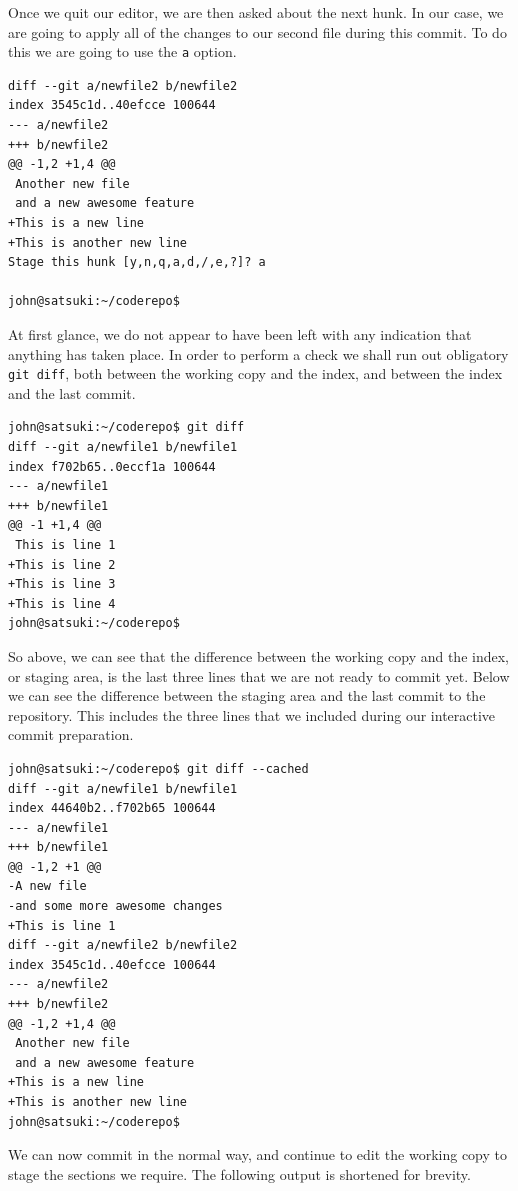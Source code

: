 Once we quit our editor, we are then asked about the next hunk.  In our case, we are going to apply all of the changes to our second file during this commit.  To do this we are going to use the \texttt{a} option.

\begin{Verbatim}[frame=leftline,framerule=1mm,fontsize=\relsize{-3}] 
diff --git a/newfile2 b/newfile2
index 3545c1d..40efcce 100644
--- a/newfile2
+++ b/newfile2
@@ -1,2 +1,4 @@
 Another new file
 and a new awesome feature
+This is a new line
+This is another new line
Stage this hunk [y,n,q,a,d,/,e,?]? a

john@satsuki:~/coderepo$ 
\end{Verbatim}

At first glance, we do not appear to have been left with any indication that anything has taken place.  In order to perform a check we shall run out obligatory \texttt{git diff}, both between the working copy and the index, and between the index and the last commit.

\begin{Verbatim}[frame=leftline,framerule=1mm,fontsize=\relsize{-3}] 
john@satsuki:~/coderepo$ git diff
diff --git a/newfile1 b/newfile1
index f702b65..0eccf1a 100644
--- a/newfile1
+++ b/newfile1
@@ -1 +1,4 @@
 This is line 1
+This is line 2
+This is line 3
+This is line 4
john@satsuki:~/coderepo$ 
\end{Verbatim}

So above, we can see that the difference between the working copy and the index, or staging area, is the last three lines that we are not ready to commit yet.  Below we can see the difference between the staging area and the last commit to the repository.  This includes the three lines that we included during our interactive commit preparation.

\begin{Verbatim}[frame=leftline,framerule=1mm,fontsize=\relsize{-3}] 
john@satsuki:~/coderepo$ git diff --cached
diff --git a/newfile1 b/newfile1
index 44640b2..f702b65 100644
--- a/newfile1
+++ b/newfile1
@@ -1,2 +1 @@
-A new file
-and some more awesome changes
+This is line 1
diff --git a/newfile2 b/newfile2
index 3545c1d..40efcce 100644
--- a/newfile2
+++ b/newfile2
@@ -1,2 +1,4 @@
 Another new file
 and a new awesome feature
+This is a new line
+This is another new line
john@satsuki:~/coderepo$ 
\end{Verbatim}

We can now commit in the normal way, and continue to edit the working copy to stage the sections we require.  The following output is shortened for brevity.

